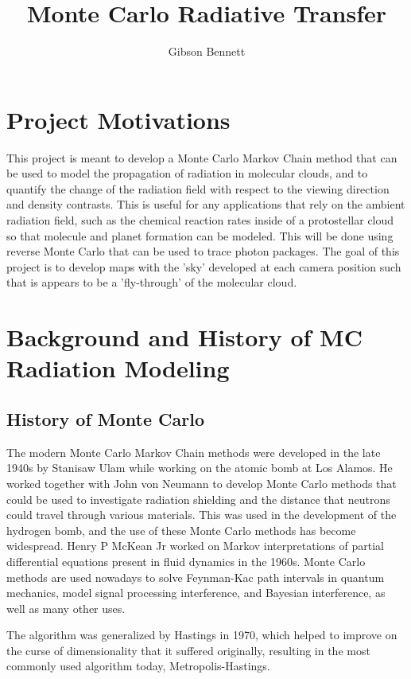 \documentclass[a4paper]{article}
\title{Monte Carlo Radiative Transfer}
\author{Gibson Bennett}
\begin{document}
\maketitle

\section{Project Motivations}
This project is meant to develop a Monte Carlo Markov Chain method that can be used to model the propagation of radiation in molecular clouds, and to quantify the change of the radiation field with respect to the viewing direction and density contrasts. This is useful for any applications that rely on the ambient radiation field, such as the chemical reaction rates inside of a protostellar cloud so that molecule and planet formation can be modeled. This will be done using reverse Monte Carlo that can be used to trace photon packages. The goal of this project is to develop maps with the 'sky' developed at each camera position such that is appears to be a 'fly-through' of the molecular cloud.
    
\section{Background and History of MC Radiation Modeling}

\subsection{History of Monte Carlo}
The modern Monte Carlo Markov Chain methods were developed in the late 1940s by Stanisaw Ulam while working on the atomic bomb at Los Alamos. He worked together with John von Neumann to develop Monte Carlo methods that could be used to investigate radiation shielding and the distance that neutrons could travel through various materials. This was used in the development of the hydrogen bomb, and the use of these Monte Carlo methods has become widespread. Henry P McKean Jr worked on Markov interpretations of partial differential equations present in fluid dynamics in the 1960s. Monte Carlo methods are used nowadays to solve Feynman-Kac path intervals in quantum mechanics, model signal processing interference, and Bayesian interference, as well as many other uses.

The algorithm was generalized by Hastings in 1970, which helped to improve on the curse of dimensionality that it suffered originally, resulting in the most commonly used algorithm today, Metropolis-Hastings.
\end{document}

